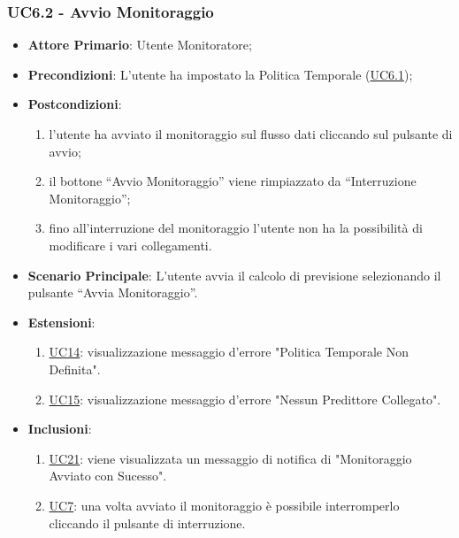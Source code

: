 	\subsubsection{UC6.2 - Avvio Monitoraggio}
		\begin{itemize}
			\item\textbf{Attore Primario}: Utente Monitoratore;
			\item\textbf{Precondizioni}: L’utente ha impostato la Politica Temporale (\hyperref[par:UC6.1]{UC6.1});
			\item\textbf{Postcondizioni}: 
				\begin{enumerate}
					\item l’utente ha avviato il monitoraggio sul flusso dati cliccando sul pulsante di avvio;
					\item il bottone “Avvio Monitoraggio” viene rimpiazzato da “Interruzione Monitoraggio”;
					\item fino all’interruzione del monitoraggio l’utente non ha la possibilità di modificare i vari collegamenti.
				\end{enumerate}
			\item\textbf{Scenario Principale}: L’utente avvia il calcolo di previsione selezionando il pulsante “Avvia Monitoraggio”. 
			\item\textbf{Estensioni}: 
				\begin{enumerate} 
					\item \hyperref[par:UC14]{UC14}: visualizzazione messaggio d’errore "Politica Temporale Non Definita".
					\item \hyperref[par:UC15]{UC15}: visualizzazione messaggio d’errore "Nessun Predittore Collegato".
				\end{enumerate}
			\item\textbf{Inclusioni}: 
				\begin{enumerate} 
					\item \hyperref[par:UC21]{UC21}: viene visualizzata un messaggio di notifica di "Monitoraggio Avviato con Sucesso".
					\item \hyperref[par:UC7]{UC7}: una volta avviato il monitoraggio è possibile interromperlo cliccando il pulsante di interruzione.
				\end{enumerate}	
		\end{itemize}	

	\label{par:UC6.3}
